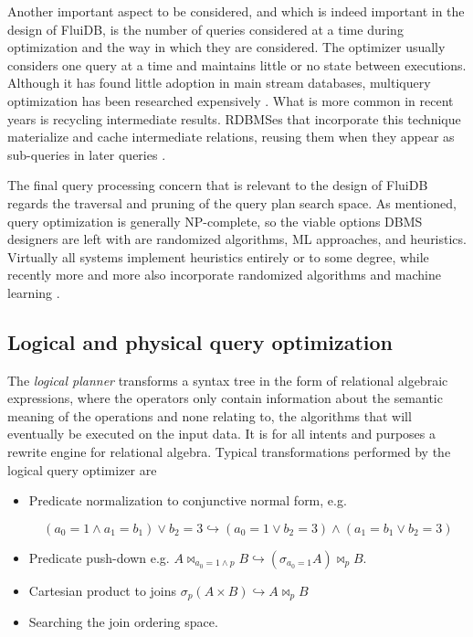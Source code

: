 Another important aspect to be considered, and which is indeed
important in the design of FluiDB, is the number of queries considered
at a time during optimization and the way in which they are
considered. The optimizer usually considers one query at a time and
maintains little or no state between executions. Although it has found
little adoption in main stream databases, multiquery optimization has
been researched expensively
\cite{michiardiCachebasedMultiqueryOptimization2021,wangMultiqueryOptimizationMapreduce2013,royEfficientExtensibleAlgorithms2000,rogersMultiqueryOptimization2017}. What
is more common in recent years is recycling intermediate
results. RDBMSes that incorporate this technique materialize and cache
intermediate relations, reusing them when they appear as sub-queries
in later queries
\cite{perezHistoryawareQueryOptimization2014,nagelRecyclingPipelinedQuery2013,ivanovaArchitectureRecyclingIntermediates2010}.

The final query processing concern that is relevant to the design of
FluiDB regards the traversal and pruning of the query plan search space. As
mentioned, query optimization is generally NP-complete, so the viable
options DBMS designers are left with are randomized algorithms, ML
approaches, and heuristics. Virtually all systems implement heuristics
entirely or to some degree, while recently more and more also
incorporate randomized algorithms
\cite{chandeGeneticOptimizationJoin2011} and machine learning
\cite{liMachineLearningDatabases2021,marcusNeoLearnedQuery2019}.

\subsection{Logical and physical query optimization}

The \emph{logical planner} transforms a syntax tree in the form of
relational algebraic expressions, where the operators only contain
information about the semantic meaning of the operations and none relating
to, the algorithms that will eventually be executed on the input
data. It is for all intents and purposes a rewrite engine for
relational algebra. Typical transformations performed by the logical
query optimizer are

\begin{itemize}
\item Predicate normalization to conjunctive normal form, e.g. 

 \[(a_0 = 1
  \land a_1 = b_1) \lor b_2 = 3 \hookrightarrow (a_0 = 1 \lor b_2 = 3)
  \land (a_1 = b_1 \lor b_2 = 3)\]
  
\item Predicate push-down e.g. \(A \Join_{a_0 = 1 \land p} B
  \hookrightarrow (\sigma_{a_0 = 1} A) \Join_p B\).
\item Cartesian product to joins \(\sigma_p ( A \times B )
  \hookrightarrow A \Join_p B\)
\item Searching the join ordering space.
\end{itemize}

